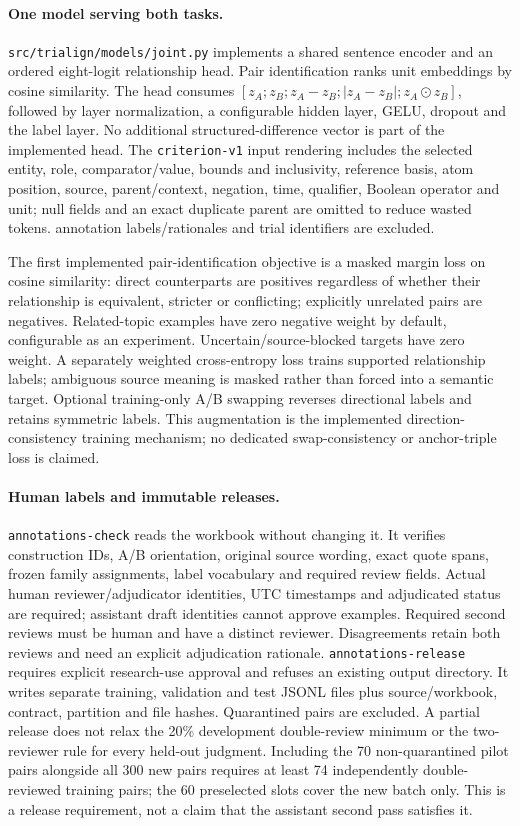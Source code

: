 \documentclass[10pt,letterpaper]{article}
\newcommand{\pathcode}[1]{\nolinkurl{#1}}
\begin{document}
\paragraph{One model serving both tasks.}
\pathcode{src/trialign/models/joint.py} implements a shared sentence encoder
and an ordered eight-logit relationship head. Pair identification ranks unit
embeddings by cosine similarity. The head consumes
\( [z_A;z_B;z_A-z_B;|z_A-z_B|;z_A\odot z_B] \), followed by layer normalization,
a configurable hidden layer, GELU, dropout and the label layer. No additional
structured-difference vector is part of the implemented head. The
\pathcode{criterion-v1} input rendering includes the selected entity, role,
comparator/value, bounds and inclusivity, reference basis, atom position,
source, parent/context, negation, time, qualifier, Boolean operator and unit;
null fields and an exact duplicate parent are omitted to reduce wasted tokens.
annotation labels/rationales and trial identifiers are excluded.

The first implemented pair-identification objective is a masked margin loss on
cosine similarity: direct counterparts are positives regardless of whether
their relationship is equivalent, stricter or conflicting; explicitly unrelated
pairs are negatives. Related-topic examples have zero negative weight by
default, configurable as an experiment. Uncertain/source-blocked targets have
zero weight. A separately weighted cross-entropy loss trains supported
relationship labels; ambiguous source meaning is masked rather than forced
into a semantic target. Optional training-only A/B swapping reverses directional
labels and retains symmetric labels. This augmentation is the implemented direction-consistency training
mechanism; no dedicated swap-consistency or anchor-triple loss is claimed.

\paragraph{Human labels and immutable releases.}
\pathcode{annotations-check} reads the workbook without changing it. It verifies
construction IDs, A/B orientation, original source wording, exact quote spans,
frozen family assignments, label vocabulary and required review fields. Actual
human reviewer/adjudicator identities, UTC timestamps and adjudicated status are
required; assistant draft identities cannot approve examples. Required second
reviews must be human and have a distinct reviewer. Disagreements retain both
reviews and need an explicit adjudication rationale.
\pathcode{annotations-release} requires explicit research-use approval and
refuses an existing output directory. It writes separate training, validation
and test JSONL files plus source/workbook, contract, partition and file hashes.
Quarantined pairs are excluded. A partial release does not relax the 20\%
development double-review minimum or the two-reviewer rule for every held-out
judgment. Including the 70 non-quarantined pilot pairs alongside all 300 new
pairs requires at least 74 independently double-reviewed training pairs; the
60 preselected slots cover the new batch only. This is a release requirement,
not a claim that the assistant second pass satisfies it.
\end{document}
